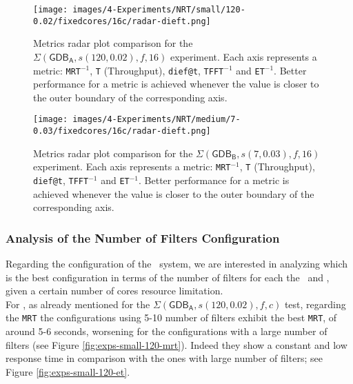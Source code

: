 \begin{figure}[H]
    \centering
    \texttt{[image: images/4-Experiments/NRT/small/120-0.02/fixedcores/16c/radar-dieft.png]}
    \caption{Metrics radar plot comparison for the $\Sigma(\mathsf{GDB_A}, s(120, 0.02), f, 16)$ experiment. Each axis represents a metric: \texttt{MRT$^{-1}$}, \texttt{T} (Throughput), \texttt{dief@t}, \texttt{TFFT$^{-1}$} and \texttt{ET$^{-1}$}. Better performance for a metric is achieved whenever the value is closer to the outer boundary of the corresponding axis.}
    \label{img:exps-small-120-radar-dieft}
\end{figure}

\begin{figure}[H]
    \centering
    \texttt{[image: images/4-Experiments/NRT/medium/7-0.03/fixedcores/16c/radar-dieft.png]}
    \caption{Metrics radar plot comparison for the $\Sigma(\mathsf{GDB_B}, s(7, 0.03), f, 16)$ experiment. Each axis represents a metric: \texttt{MRT$^{-1}$}, \texttt{T} (Throughput), \texttt{dief@t}, \texttt{TFFT$^{-1}$} and \texttt{ET$^{-1}$}. Better performance for a metric is achieved whenever the value is closer to the outer boundary of the corresponding axis.}
    \label{img:exps-medium-7D-radar-dieft}
\end{figure}

\subsubsection*{Analysis of the Number of Filters Configuration}

Regarding the configuration of the \DPATM\ system, we are interested in analyzing which is the best configuration in terms of the number of filters for each the \smallG\ and \mediumG, given a certain number of cores resource limitation.\\

For \smallG, as already mentioned for the $\Sigma(\mathsf{GDB_A}, s(120, 0.02), f, c)$ test, regarding the \texttt{MRT} the configurations using 5-10 number of filters exhibit the best \texttt{MRT}, of around 5-6 seconds, worsening for the configurations with a large number of filters (see Figure \ref{fig:exps-small-120-mrt}). Indeed they show a constant and low response time in comparison with the ones with large number of filters; see Figure \ref{fig:exps-small-120-et}.\\

